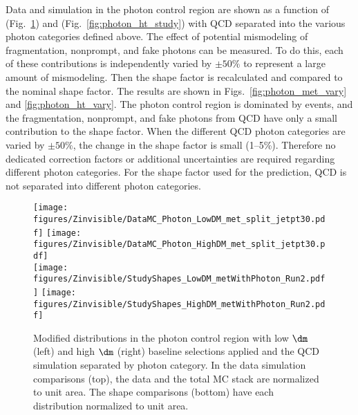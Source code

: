 Data and simulation in the photon control region are shown as a function of \metphoton (Fig.~\ref{fig:photon_met_study}) and \HT (Fig.~\ref{fig:photon_ht_study}) with QCD separated into the various photon categories defined above.
The effect of potential mismodeling of fragmentation, nonprompt, and fake photons can be measured.
To do this, each of these contributions is independently varied by $\pm 50\%$ to represent a large amount of mismodeling.
Then the shape factor is recalculated and compared to the nominal shape factor.
The results are shown in Figs.~\ref{fig:photon_met_vary} and \ref{fig:photon_ht_vary}.
The photon control region is dominated by \gjets events, and the fragmentation, nonprompt, and fake photons from QCD have only a small contribution to the shape factor.
When the different QCD photon categories are varied by $\pm 50\%$, the change in the shape factor is small (1--5\%).
Therefore no dedicated correction factors or additional uncertainties are required regarding different photon categories.
For the shape factor used for the \znunu prediction, QCD is not separated into different photon categories.

\begin{figure}[tbp]
{
\centering
\texttt{[image: figures/Zinvisible/DataMC\_Photon\_LowDM\_met\_split\_jetpt30.pdf]}
\texttt{[image: figures/Zinvisible/DataMC\_Photon\_HighDM\_met\_split\_jetpt30.pdf]}\\
\centering
\texttt{[image: figures/Zinvisible/StudyShapes\_LowDM\_metWithPhoton\_Run2.pdf]}
\hspace*{2ex}
\texttt{[image: figures/Zinvisible/StudyShapes\_HighDM\_metWithPhoton\_Run2.pdf]}\\
\caption[Modified \metphoton distributions in the photon control region with low $\dm$ and high $\dm$ baseline selections applied and the QCD simulation separated by photon category]
{
    Modified \metphoton distributions in the photon control region with low $\dm$ (left) and high $\dm$ (right) baseline selections applied and the QCD simulation separated by photon category.
    In the data simulation comparisons (top), the data and the total MC stack are normalized to unit area.
    The shape comparisons (bottom) have each distribution normalized to unit area.
}
\label{fig:photon_met_study}
}
\end{figure}


